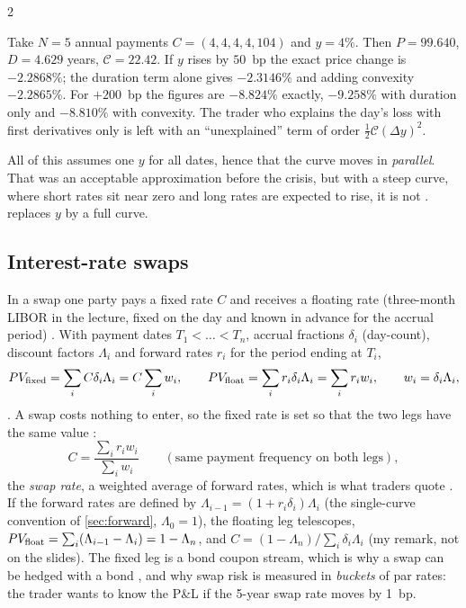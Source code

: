 \begin{paracol}{2}
\begin{example}\label{ch20:ex-bond}
Take $N=5$ annual payments $C=(4,4,4,4,104)$ and $y=4\%$. Then $P=99.640$, $D=4.629$ years, $\mathcal C=22.42$. If $y$ rises by $50$~bp the exact
price change is $-2.2868\%$; the duration term alone gives $-2.3146\%$ and adding convexity $-2.2865\%$. For $+200$~bp the figures are
$-8.824\%$ exactly, $-9.258\%$ with duration only and $-8.810\%$ with convexity. The trader who
explains the day's loss with first derivatives only  is left with an ``unexplained'' term
of order $\frac12\mathcal C(\Delta y)^2$.
\end{example}

All of this assumes one $y$ for all dates, hence that the curve moves in \emph{parallel}. That was an acceptable
approximation before the crisis, but with a steep curve, where short rates sit near zero and long rates are expected to
rise, it is not .  replaces $y$ by a full curve.

\subsection{Interest-rate swaps}\label{ch20:sec-swaps}
In a swap one party pays a fixed rate $C$ and receives a floating rate (three-month LIBOR in the lecture, fixed on the
day and known in advance for the accrual period) . With payment dates $T_1<\dots<T_n$, accrual
fractions $\delta_i$ (day-count), discount factors $\Lambda_i$ and forward rates $r_i$ for the period ending at $T_i$,
\[
  PV_{\rm fixed}=\sum_iC\delta_i\Lambda_i=C\sum_iw_i,\qquad PV_{\rm float}=\sum_ir_i\delta_i\Lambda_i=\sum_ir_iw_i,\qquad w_i=\delta_i\Lambda_i,
\]
. A swap costs nothing to enter, so the fixed rate is set so that the two legs have the same value
:
\begin{equation}\label{ch20:eq-swaprate}
  C=\frac{\sum_ir_iw_i}{\sum_iw_i}\qquad(\text{same payment frequency on both legs}),
\end{equation}
the \emph{swap rate}, a weighted average of forward rates, which is what traders quote . If the forward
rates are defined by $\Lambda_{i-1}=(1+r_i\delta_i)\Lambda_i$ (the single-curve convention of \cref{sec:forward}, $\Lambda_0=1$), the floating leg telescopes,
$PV_{\rm float}=\sum_i(\Lambda_{i-1}-\Lambda_i)=1-\Lambda_n$, and $C=(1-\Lambda_n)/\sum_i\delta_i\Lambda_i$ (my remark, not on the slides). The fixed leg is a bond coupon stream, which is why a swap can be
hedged with a bond , and why swap risk is measured in \emph{buckets} of par rates: the trader wants to know
the P\&L if the 5-year swap rate moves by 1~bp.


\end{paracol}
